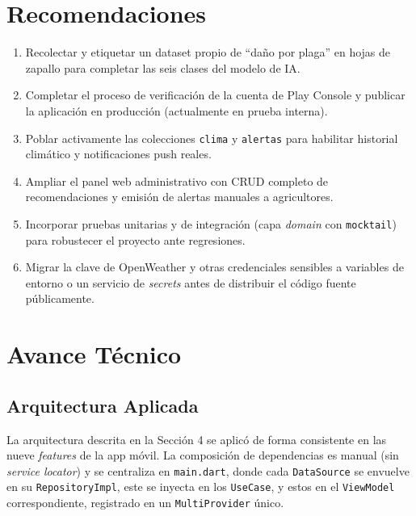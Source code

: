 \documentclass[12pt,a4paper]{article}
\begin{document}
\section{Recomendaciones}

\begin{enumerate}
  \item Recolectar y etiquetar un dataset propio de ``daño por plaga'' en
        hojas de zapallo para completar las seis clases del modelo de IA.
  \item Completar el proceso de verificación de la cuenta de Play Console y
        publicar la aplicación en producción (actualmente en prueba interna).
  \item Poblar activamente las colecciones \texttt{clima} y \texttt{alertas}
        para habilitar historial climático y notificaciones push reales.
  \item Ampliar el panel web administrativo con CRUD completo de
        recomendaciones y emisión de alertas manuales a agricultores.
  \item Incorporar pruebas unitarias y de integración (capa \textit{domain}
        con \texttt{mocktail}) para robustecer el proyecto ante regresiones.
  \item Migrar la clave de OpenWeather y otras credenciales sensibles a
        variables de entorno o un servicio de \textit{secrets} antes de
        distribuir el código fuente públicamente.
\end{enumerate}

\newpage
\section{Avance Técnico}

\subsection{Arquitectura Aplicada}

La arquitectura descrita en la Sección 4 se aplicó de forma consistente en las
nueve \textit{features} de la app móvil. La composición de dependencias es
manual (sin \textit{service locator}) y se centraliza en \texttt{main.dart},
donde cada \texttt{DataSource} se envuelve en su \texttt{RepositoryImpl}, este
se inyecta en los \texttt{UseCase}, y estos en el \texttt{ViewModel}
correspondiente, registrado en un \texttt{MultiProvider} único.
\end{document}
